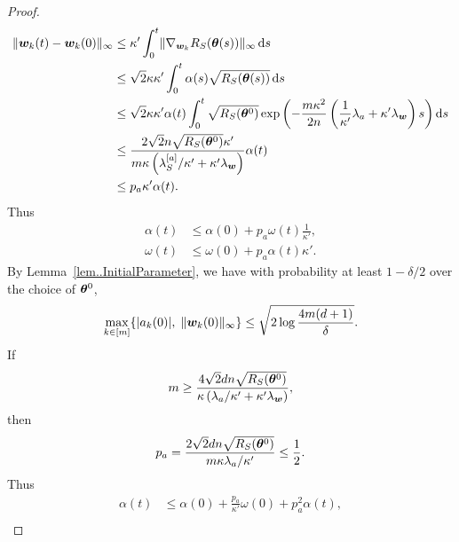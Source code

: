 \documentclass{article}
\begin{document}
\begin{proof}
\begin{equation*}
        \begin{aligned}
            \lVert\bm{w}_k(t) - \bm{w}_k(0)\rVert_{\infty}
             & \leq \kappa'\int_{0}^{t} \lVert\nabla_{\bm{w}_k}R_S(\bm{\theta}(s))\rVert_{\infty}\mathop{}\!\mathrm{d}{s}                                                                                                     \\
             & \leq \sqrt{2}\kappa\kappa' \int_{0}^t \alpha(s)\sqrt{R_S(\bm{\theta}(s))} \mathop{}\!\mathrm{d}{s}                                                                                                     \\
             & \leq \sqrt{2}\kappa\kappa' \alpha(t) \int_{0}^{t} \sqrt{R_S(\bm{\theta}^0)}\exp\left(-\frac{m\kappa^2}{2n}\left(\frac{1}{\kappa'}\lambda_a+\kappa'\lambda_{\bm{w}}\right)s\right)\mathop{}\!\mathrm{d}{s} \\
             & \leq \frac{2\sqrt{2}n\sqrt{R_S(\bm{\theta}^0)}\kappa'}{m\kappa\left(\lambda^{[a]}_S/\kappa'+\kappa'\lambda_{\bm{w}}\right)}\alpha(t)                                                      \\
             & \leq p_a\kappa'\alpha(t).
        \end{aligned}
    \end{equation*}
    Thus
    \begin{equation*}
        \begin{aligned}
            \alpha(t) & \leq\alpha(0)+p_a\omega(t)\frac{1}{\kappa'}, \\
            \omega(t) & \leq\omega(0)+p_a\alpha(t)\kappa'.
        \end{aligned}
    \end{equation*}
    By Lemma~\ref{lem..InitialParameter}, we have with probability at least $1 - \delta/2$ over the choice of $\bm{\theta}^0$,
    \begin{equation*}
        \max\limits_{k\in[m]}\{\lvert a_k(0)\rvert,\;\lVert\bm{w}_k(0)\rVert_{\infty}\}\leq\sqrt{2\log\frac{4m(d+1)}{\delta}}.
    \end{equation*}
    If
    \begin{equation*}
        m \geq \frac{4\sqrt{2}dn\sqrt{R_S(\bm{\theta}^0)}}{\kappa\left(\lambda_a/\kappa'+\kappa'\lambda_{\bm{w}}\right)},
    \end{equation*}
    then
    \begin{equation*}
        p_a=\frac{2\sqrt{2}dn\sqrt{R_S(\bm{\theta}^0)}}{m\kappa\lambda_a/\kappa'}\leq \frac{1}{2}.
    \end{equation*}
    Thus
    \begin{align*}
        \alpha(t) & \leq\alpha(0)+\frac{p_a}{\kappa'}\omega(0)+p_a^2\alpha(t),      \\

\end{align*}
\end{proof}
\end{document}
